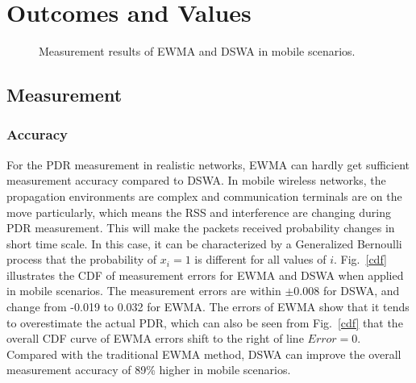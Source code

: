 \documentclass[draftclsnofoot,conference,onecolumn,11pt]{IEEEtran}
\begin{document}
\section{Outcomes and Values}
\begin{figure}[!t]
\centerline{
}
\caption{Measurement results of EWMA and DSWA in mobile scenarios.}
\label{DSWA_error}
\end{figure}

\subsection{Measurement}
\subsubsection{Accuracy}
For the PDR measurement in realistic networks, EWMA can hardly get sufficient measurement accuracy compared to DSWA. In mobile wireless networks, the propagation environments are complex and communication terminals are on the move particularly, which means the RSS and interference are changing during PDR measurement. This will make the packets received probability changes in short time scale. In this case, it can be characterized by a Generalized Bernoulli process that the probability of $x_i=1$ is different for all values of $i$. Fig.~\ref{cdf} illustrates the CDF of measurement errors for EWMA and DSWA when applied in mobile scenarios. The measurement errors are within $\pm$0.008 for DSWA, and change from -0.019 to 0.032 for EWMA. The errors of EWMA show that it tends to overestimate the actual PDR, which can also be seen from Fig.~\ref{cdf} that the overall CDF curve of EWMA errors shift to the right of line $Error=0$. Compared with the traditional EWMA method, DSWA can improve the overall measurement accuracy of 89\% higher in mobile scenarios.
\end{document}

